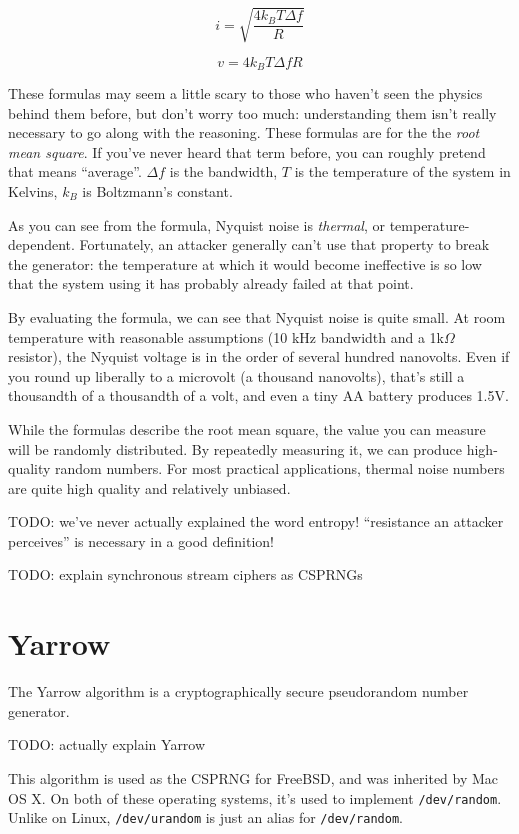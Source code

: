 \documentclass[11pt,ebook,table,dvipsnames]{memoir}
\begin{document}
\[
i = \sqrt{\frac{4 k_B T \Delta f}{R}}
\]

\[
v = 4 k_B T \Delta f R
\]

These formulas may seem a little scary to those who haven't seen the
physics behind them before, but don't worry too much: understanding
them isn't really necessary to go along with the reasoning. These
formulas are for the the \emph{root mean square}. If you've never heard
that term before, you can roughly pretend that means \enquote{average}.
$\Delta f$ is the bandwidth, $T$ is the temperature of the system in
Kelvins, $k_B$ is Boltzmann's constant.

As you can see from the formula, Nyquist noise is \emph{thermal}, or
temperature-dependent. Fortunately, an attacker generally can't use
that property to break the generator: the temperature at which it
would become ineffective is so low that the system using it has
probably already failed at that point.

By evaluating the formula, we can see that Nyquist noise is quite
small. At room temperature with reasonable assumptions (10 kHz
bandwidth and a 1k$\Omega$ resistor), the Nyquist voltage is in the
order of several hundred nanovolts. Even if you round up liberally to
a microvolt (a thousand nanovolts), that's still a thousandth of a
thousandth of a volt, and even a tiny AA battery produces 1.5V.

While the formulas describe the root mean square, the value you can
measure will be randomly distributed. By repeatedly measuring it, we
can produce high-quality random numbers. For most practical
applications, thermal noise numbers are quite high quality and
relatively unbiased.

TODO: we've never actually explained the word entropy! \enquote{resistance an
attacker perceives} is necessary in a good definition!

TODO: explain synchronous stream ciphers as CSPRNGs
\section{Yarrow}
\label{sec-2-10-3}

The Yarrow algorithm is a cryptographically secure pseudorandom number
generator.

TODO: actually explain Yarrow

This algorithm is used as the CSPRNG for FreeBSD, and was inherited by
Mac OS X. On both of these operating systems, it's used to implement
\verb|/dev/random|. Unlike on Linux, \verb|/dev/urandom| is just an
alias for \verb|/dev/random|.
\end{document}
